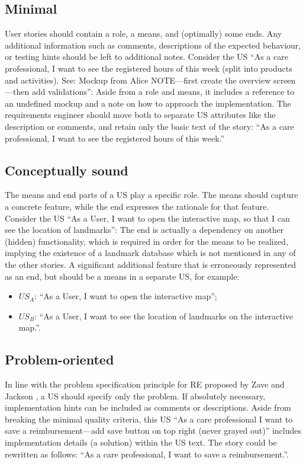 \subsection*{\normalsize{Minimal}}
User stories should contain a role, a means, and (optimally) some ends. Any additional information such as comments, descriptions of the expected behaviour, or testing hints should be left to additional notes. Consider the US \enquote{As a care professional, I want to see the registered hours of this week (split into products and activities). See: Mockup from Alice NOTE—first create the overview screen—then add validations}: Aside from a role and means, it includes a reference to an undefined mockup and a note on how to approach the implementation. The requirements engineer should move both to separate US attributes like the description or comments, and retain only the basic text of the story: \enquote{As a care professional, I want to see the registered hours of this week.}
\subsection*{\normalsize{Conceptually sound}}
The means and end parts of a US play a specific role. The means should capture a concrete feature, while the end expresses the rationale for that feature. Consider the US \enquote{As a User, I want to open the interactive map, so that I can see the location of landmarks}: The end is actually a dependency on another (hidden) functionality, which is required in order for the means to be realized, implying the existence of a landmark database which is not mentioned in any of the other stories. A significant additional feature that is erroneously represented as an end, but should be a means in a separate US, for example:
\begin{itemize}
\item $US_A$: \enquote{As a User, I want to open the interactive map};
\item $US_B$: \enquote{As a User, I want to see the location of landmarks on the interactive map.}.
\end{itemize}
\subsection*{\normalsize{Problem-oriented}}
In line with the problem specification principle for RE proposed by Zave and Jackson \cite{zave1997four}, a US should specify only the problem. If absolutely necessary, implementation hints can be included as comments or descriptions. Aside from breaking the minimal quality criteria, this US \enquote{As a care professional I want to save a reimbursement—add save button on top right (never grayed out)} includes implementation details (a solution) within the US text. The story could be rewritten as follows: \enquote{As a care professional, I want to save a reimbursement.}.
